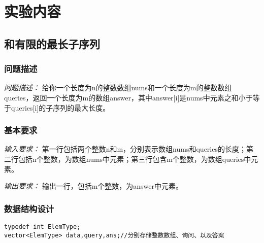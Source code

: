 \documentclass[a4paper,11pt]{article}%
\newenvironment{shadedquotation}
 {\begin{shaded*}
  \quoting[leftmargin=0pt, vskip=0pt]
 }
 {\endquoting
 \end{shaded*}
}
\begin{document}
\section{实验内容}
\subsection{和有限的最长子序列}
\subsubsection{问题描述}
\begin{shadedquotation}
    \emph{问题描述：}
    给你一个长度为n的整数数组nums和一个长度为m的整数数组queries，返回一个长度为m的数组answer，其中answer[i]是nums中元素之和小于等于queries[i]的子序列的最大长度。
\end{shadedquotation}
\subsubsection{基本要求}
\begin{shadedquotation}
    \emph{输入要求：}
    第一行包括两个整数n和m，分别表示数组nums和queries的长度；第二行包括n个整数，为数组nums中元素；第三行包含m个整数，为数组queries中元素。
\end{shadedquotation}
\begin{shadedquotation}
    \emph{输出要求：}
    输出一行，包括m个整数，为answer中元素。
\end{shadedquotation}
\subsubsection{数据结构设计}
\begin{lstlisting}[language={[ANSI]C},keywordstyle=\color{blue!70},commentstyle=\color{red!50!green!50!blue!50},frame=shadowbox,
				rulesepcolor=\color{red!20!green!20!blue!20}]
typedef int ElemType;
vector<ElemType> data,query,ans;//分别存储整数数组、询问、以及答案
\end{lstlisting}
\end{document}
